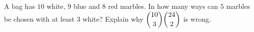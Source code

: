 A bag has $10$ white, $9$ blue and $8$ red marbles. In how many ways can $5$ marbles be chosen with at least $3$ white? Explain why $\dbinom{10}3\dbinom{24}2$ is wrong.
